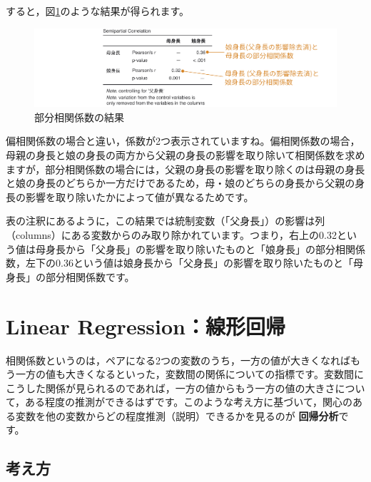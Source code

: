 \documentclass[
  12pt,
  a5jpaper,
  lualatex, ja=standard]{bxjsbook}
\renewcommand{\emph}[1]{\textbf{\color{emph} #1}}
\begin{document}
すると，図\ref{fig:regression-semipartial-results}のような結果が得られます。

\begin{figure}[!ht]

{\centering \includegraphics[width=1\linewidth]{images/regression/semipartial-results} 

}

\caption{部分相関係数の結果}\label{fig:regression-semipartial-results}
\end{figure}

偏相関係数の場合と違い，係数が2つ表示されていますね。偏相関係数の場合，母親の身長と娘の身長の両方から父親の身長の影響を取り除いて相関係数を求めますが，部分相関係数の場合には，父親の身長の影響を取り除くのは母親の身長と娘の身長のどちらか一方だけであるため，母・娘のどちらの身長から父親の身長の影響を取り除いたかによって値が異なるためです。

表の注釈にあるように，この結果では統制変数（「父身長」）の影響は列（columns）にある変数からのみ取り除かれています。つまり，右上の0.32という値は母身長から「父身長」の影響を取り除いたものと「娘身長」の部分相関係数，左下の0.36という値は娘身長から「父身長」の影響を取り除いたものと「母身長」の部分相関係数です。

\hypertarget{sec:regression-LR}{%
\section{Linear Regression：線形回帰}\label{sec:regression-LR}}

相関係数というのは，ペアになる2つの変数のうち，一方の値が大きくなればもう一方の値も大きくなるといった，変数間の関係についての指標です。変数間にこうした関係が見られるのであれば，一方の値からもう一方の値の大きさについて，ある程度の推測ができるはずです。このような考え方に基づいて，関心のある変数を他の変数からどの程度推測（説明）できるかを見るのが\emph{回帰分析}です。

\hypertarget{sub:regression-LR-basic}{%
\subsection{考え方}\label{sub:regression-LR-basic}}
\end{document}
